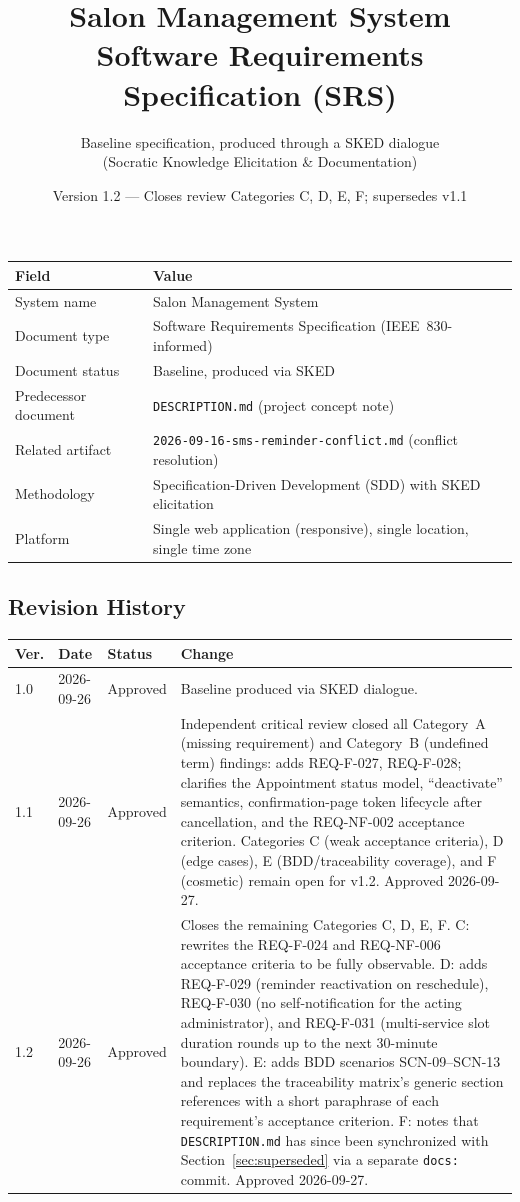 \documentclass[11pt,a4paper]{article}
\title{Salon Management System\\
\large Software Requirements Specification (SRS)}
\author{Baseline specification, produced through a SKED dialogue \\ (Socratic Knowledge Elicitation \& Documentation)}
\date{Version 1.2 --- Closes review Categories C, D, E, F; supersedes v1.1}
\begin{document}
\maketitle

\begin{center}
\begin{tabularx}{0.9\textwidth}{@{}lX@{}}
\toprule
Field & Value \\
\midrule
System name & Salon Management System \\
Document type & Software Requirements Specification (IEEE~830-informed) \\
Document status & Baseline, produced via SKED \\
Predecessor document & \texttt{DESCRIPTION.md} (project concept note) \\
Related artifact & \texttt{2026-09-16-sms-reminder-conflict.md} (conflict resolution) \\
Methodology & Specification-Driven Development (SDD) with SKED elicitation \\
Platform & Single web application (responsive), single location, single time zone \\
\bottomrule
\end{tabularx}
\end{center}

\subsection*{Revision History}
\begin{tabularx}{\textwidth}{@{}lll X@{}}
\toprule
Ver. & Date & Status & Change \\
\midrule
1.0 & 2026-09-26 & Approved & Baseline produced via SKED dialogue. \\
1.1 & 2026-09-26 & Approved & Independent critical review closed all
  Category~A (missing requirement) and Category~B (undefined term)
  findings: adds REQ-F-027, REQ-F-028; clarifies the Appointment status
  model, ``deactivate'' semantics, confirmation-page token lifecycle after
  cancellation, and the REQ-NF-002 acceptance criterion. Categories C
  (weak acceptance criteria), D (edge cases), E (BDD/traceability
  coverage), and F (cosmetic) remain open for v1.2. Approved 2026-09-27. \\
1.2 & 2026-09-26 & Approved & Closes the remaining Categories C, D, E, F.
  C: rewrites the REQ-F-024 and REQ-NF-006 acceptance criteria to be fully
  observable. D: adds REQ-F-029 (reminder reactivation on reschedule),
  REQ-F-030 (no self-notification for the acting administrator), and
  REQ-F-031 (multi-service slot duration rounds up to the next 30-minute
  boundary). E: adds BDD scenarios SCN-09--SCN-13 and replaces the
  traceability matrix's generic section references with a short paraphrase
  of each requirement's acceptance criterion. F: notes that
  \texttt{DESCRIPTION.md} has since been synchronized with
  Section~\ref{sec:superseded} via a separate \texttt{docs:} commit.
  Approved 2026-09-27. \\
\bottomrule
\end{tabularx}
\end{document}

